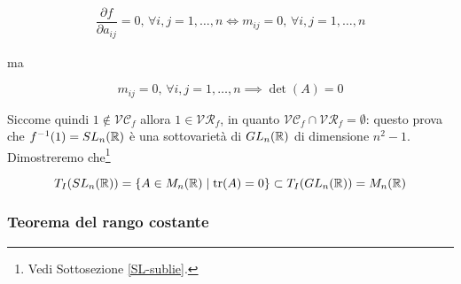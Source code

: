 \begin{align}
	\dfrac{\partial f}{\partial a_{ij}} = 0, \, \forall i,j=1,\dots,n \iff m_{ij} = 0, \, \forall i,j=1,\dots,n
\end{align}

ma

\begin{equation}
	m_{ij} = 0, \, \forall i,j=1,\dots,n \implies \det(A) = 0
\end{equation}

Siccome quindi $ 1 \notin \mathcal{VC}_{f} $ allora $ 1 \in \mathcal{VR}_{f} $, in quanto $ \mathcal{VC}_{f} \cap \mathcal{VR}_{f} = \emptyset $: questo prova che $ f^{-1}(1) = SL_{n}(\mathbb{R}) $ è una sottovarietà di $ GL_{n}(\mathbb{R}) $ di dimensione $ n^{2}-1 $.\\
Dimostreremo che\footnote{%
	Vedi Sottosezione \ref{SL-sublie}.}

\begin{equation}
	T_{I}(SL_{n}(\mathbb{R})) = \{ A \in M_{n}(\mathbb{R}) \mid \tr(A)=0 \} \subset T_{I}(GL_{n}(\mathbb{R})) = M_{n}(\mathbb{R})
\end{equation}

\subsubsection{Teorema del rango costante}

